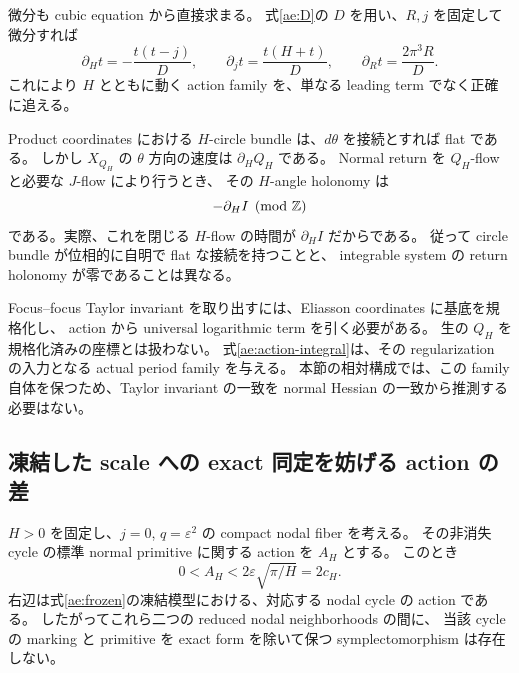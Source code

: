 微分も cubic equation から直接求まる。
式\eqref{ae:D}の $D$ を用い、$R,j$ を固定して微分すれば
\begin{equation}\label{ae:implicit-derivatives}
 \partial_Ht=-\frac{t(t-j)}D,\qquad
 \partial_jt=\frac{t(H+t)}D,\qquad
 \partial_Rt=\frac{2\pi^3R}D.
\end{equation}
これにより $H$ とともに動く action family を、単なる leading term でなく正確に追える。

Product coordinates における $H$-circle bundle は、$d\theta$ を接続とすれば flat である。
しかし $X_{Q_H}$ の $\theta$ 方向の速度は $\partial_HQ_H$ である。
Normal return を $Q_H$-flow と必要な $J$-flow により行うとき、
その $H$-angle holonomy は
\begin{equation}\label{ae:holonomy}
 -\partial_H I\pmod{\mathbb Z}
\end{equation}
である。実際、これを閉じる $H$-flow の時間が $\partial_HI$ だからである。
従って circle bundle が位相的に自明で flat な接続を持つことと、
integrable system の return holonomy が零であることは異なる。

Focus--focus Taylor invariant を取り出すには、Eliasson coordinates に基底を規格化し、
action から universal logarithmic term を引く必要がある\cite{vungoc-local}。
生の $Q_H$ を規格化済みの座標とは扱わない。
式\eqref{ae:action-integral}は、その regularization の入力となる actual period family を与える。
本節の相対構成では、この family 自体を保つため、Taylor invariant の一致を
normal Hessian の一致から推測する必要はない。

\subsection{凍結した scale への exact 同定を妨げる action の差}

\begin{proposition}\label{ae:action-obstruction}
$H>0$ を固定し、$j=0$, $q=\varepsilon^2$ の compact nodal fiber を考える。
その非消失 cycle の標準 normal primitive に関する action を $A_H$ とする。
このとき
\begin{equation}\label{ae:action-strict}
 0<A_H<2\varepsilon\sqrt{\pi/H}=2c_H.
\end{equation}
右辺は式\eqref{ae:frozen}の凍結模型における、対応する nodal cycle の action である。
したがってこれら二つの reduced nodal neighborhoods の間に、
当該 cycle の marking と primitive を exact form を除いて保つ symplectomorphism は存在しない。
\end{proposition}


